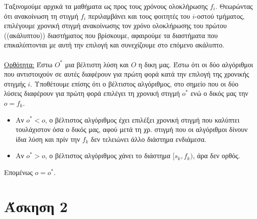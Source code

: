 \documentclass[12pt,a4paper]{article}
\begin{document}
    Ταξινομούμε αρχικά τα μαθήματα ως προς τους χρόνους ολοκλήρωσης \( f_i \).
    Θεωρώντας ότι ανακοίνωση τη στιγμή \( f_i \) περιλαμβάνει και τους φοιτητές
    του \( i \)-οστού τμήματος, επιλέγουμε χρονική στιγμή ανακοίνωσης τον 
    χρόνο ολοκλήρωσης του πρώτου ((ακάλυπτου)) διαστήματος που βρίσκουμε,
    αφαιρούμε τα διαστήματα που επικαλύπτονται με αυτή την επιλογή και
    συνεχίζουμε στο επόμενο ακάλυπτο.\\ %
    \\
    \underline{Ορθότητα:} Έστω \( O^{*} \) μια βέλτιστη λύση και \( Ο \) η δικη
    μας. Έστω ότι οι δύο αλγόριθμοι που αντιστοιχούν σε αυτές διαφέρουν για
    πρώτη φορά κατά την επιλογή της χρονικής στιγμής \( i \). Υποθέτουμε επίσης
    ότι ο βέλτιστος αλγόριθμος, στο σημείο που οι δύο λύσεις διαφέρουν για πρώτη
    φορά επιλέγει τη χρονική στιγμή \( ο^{*} \) ενώ ο δικός μας την \( ο = f_k 
    \).
    \begin{itemize}
      \item Αν \( o^{*} < o \), ο βέλτιστος αλγόριθμος έχει επιλέξει χρονική
            στιγμή που καλύπτει τουλάχιστον όσα ο δικός μας, αφού μετά τη χρ.
            στιγμή που οι αλγόριθμοι δίνουν ίδια λύση και πρίν την
            \( f_k \) δεν τελειώνει άλλο διάστημα ενδιάμεσα.
      \item Αν \( o^{*} > o \), ο βέλτιστος αλγόριθμος χάνει το διάστημα
            \( [s_k, f_k) \), άρα δεν ορθός.
    \end{itemize}
    Επομένως \( ο = ο^{*} \).
  
  \section{Άσκηση 2}
\end{document}
